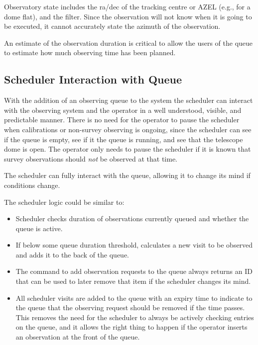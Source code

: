 \documentclass[TS,toc,lsstdraft]{lsstdoc}
\begin{document}
Observatory state includes the ra/dec of the tracking centre or AZEL (e.g., for a dome flat), and the filter.
Since the observation will not know when it is going to be executed, it cannot accurately state the azimuth of the observation.

An estimate of the observation duration is critical to allow the users of the queue to estimate how much observing time has been planned.

\subsection{Scheduler Interaction with Queue}

With the addition of an observing queue to the system the scheduler can interact with the observing system and the operator in a well understood, visible, and predictable manner.
There is no need for the operator to pause the scheduler when calibrations or non-survey observing is ongoing, since the scheduler can see if the queue is empty, see if it the queue is running, and see that the telescope dome is open.
The operator only needs to pause the scheduler if it is known that survey observations should \emph{not} be observed at that time.

The scheduler can fully interact with the queue, allowing it to change its mind if conditions change.

The scheduler logic could be similar to:

\begin{itemize}

\item Scheduler checks duration of observations currently queued and whether the queue is active.

\item If below some queue duration threshold, calculates a new visit to be observed and adds it to the back of the queue.

\item The command to add observation requests to the queue always returns an ID that can be used to later remove that item if the scheduler changes its mind.

\item All scheduler visits are added to the queue with an expiry time to indicate to the queue that the observing request should be removed if the time passes.
This removes the need for the scheduler to always be actively checking entries on the queue, and it allows the right thing to happen if the operator inserts an observation at the front of the queue.

\end{itemize}
\end{document}
